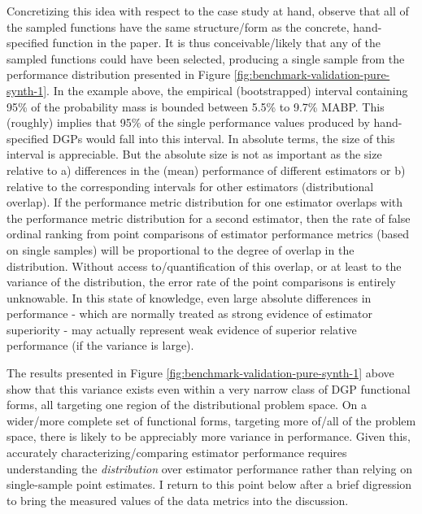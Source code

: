 \documentclass[../main.tex]{subfiles}
\begin{document}
Concretizing this idea with respect to the case study at hand, observe that all of the sampled functions have the same structure/form as the concrete, hand-specified function in the paper. It is thus conceivable/likely that any of the sampled functions could have been selected, producing a single sample from the performance distribution presented in Figure \ref{fig:benchmark-validation-pure-synth-1}. In the example above, the empirical (bootstrapped) interval containing 95\% of the probability mass is bounded between 5.5\% to 9.7\% MABP. This (roughly) implies that 95\% of the single performance values produced by hand-specified DGPs would fall into this interval. In absolute terms, the size of this interval is appreciable. But the absolute size is not as important as the size relative to a) differences in the (mean) performance of different estimators or b) relative to the corresponding intervals for other estimators (distributional overlap). If the performance metric distribution for one estimator overlaps with the performance metric distribution for a second estimator, then the rate of false ordinal ranking from point comparisons of estimator performance metrics (based on single samples) will be proportional to the degree of overlap in the distribution. Without access to/quantification of this overlap, or at least to the variance of the distribution, the error rate of the point comparisons is entirely unknowable. In this state of knowledge, even large absolute differences in performance - which are normally treated as strong evidence of estimator superiority - may actually represent weak evidence of superior relative performance (if the variance is large).

\vspace{\baselineskip}

The results presented in Figure \ref{fig:benchmark-validation-pure-synth-1} above show that this variance exists even within a very narrow class of DGP functional forms, all targeting one region of the distributional problem space. On a wider/more complete set of functional forms, targeting more of/all of the problem space, there is likely to be appreciably more variance in performance. Given this, accurately characterizing/comparing estimator performance requires understanding the \textit{distribution} over estimator performance rather than relying on single-sample point estimates. I return to this point below after a brief digression to bring the measured values of the data metrics into the discussion.
\end{document}
